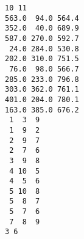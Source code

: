 \addtolength{\baselineskip}{-1mm}
\begin{verbatim}
10 11 
563.0  94.0 564.4 
352.0  40.0 689.9 
587.0 270.0 592.7 
 24.0 284.0 530.8 
202.0 310.0 751.5 
 76.0  98.0 566.7 
285.0 233.0 796.8 
303.0 362.0 761.1 
401.0 204.0 780.1 
163.0 385.0 676.2 
 1  3  9 
 1  9  2 
 2  9  7 
 2  7  6 
 3  9  8 
 4 10  5 
 4  5  6 
 5 10  8 
 5  8  7 
 5  7  6 
 7  8  9 
3 6
\end{verbatim}
\addtolength{\baselineskip}{1mm}

